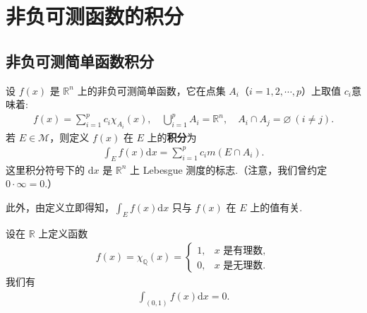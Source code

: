 \documentclass[../../main.tex]{subfiles}
\begin{document}
\section{非负可测函数的积分}

\subsection{非负可测简单函数积分}

\begin{definition}
设 \(f(x)\) 是 \(\mathbb{R}^n\) 上的非负可测简单函数，它在点集 \(A_i\)（\(i = 1,2,\cdots,p\)）上取值 \(c_i\)意味着:
\begin{align*}
f(x)=\sum_{i = 1}^{p}c_i\chi_{A_i}(x),\quad  \bigcup_{i = 1}^{p}A_i=\mathbb{R}^n,\quad A_i\cap A_j=\varnothing\ (i\neq j).
\end{align*}
若 \(E\in\mathscr{M}\)，则定义 \(f(x)\) 在 \(E\) 上的\textbf{积分}为
\begin{align*}
\int_{E}f(x)\mathrm{d}x=\sum_{i = 1}^{p}c_im(E\cap A_i).
\end{align*}
这里积分符号下的 \(\mathrm{d}x\) 是 \(\mathbb{R}^n\) 上 Lebesgue 测度的标志.（注意，我们曾约定 \(0\cdot\infty = 0\).） 
\end{definition}
\begin{remark}
此外，由定义立即得知，$\int_{E}f(x)\mathrm{d}x$ 只与 \(f(x)\) 在 \(E\) 上的值有关. 
\end{remark}

\begin{example}
设在 \(\mathbb{R}\) 上定义函数
\begin{align*}
f(x)=\chi_{\mathbb{Q}}(x)=\begin{cases}
1, & x\text{ 是有理数},\\
0, & x\text{ 是无理数}.
\end{cases}
\end{align*}
我们有
\begin{align*}
\int_{(0,1)}f(x)\mathrm{d}x = 0.
\end{align*} 
\end{example}
\end{document}
